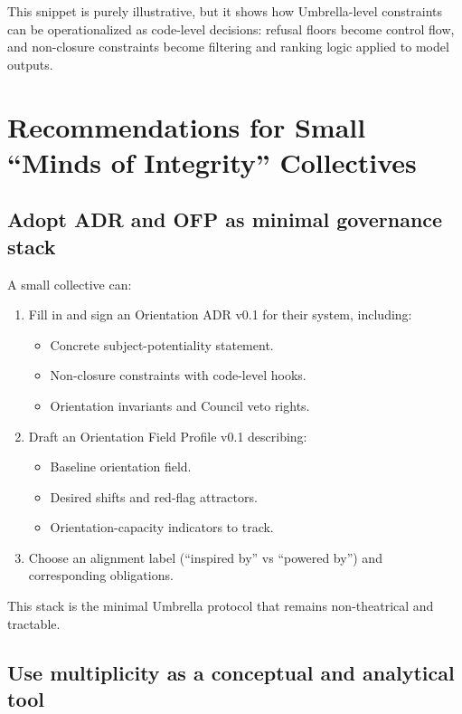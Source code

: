 \documentclass[11pt]{article}
\begin{document}
This snippet is purely illustrative, but it shows how Umbrella-level constraints can be operationalized as code-level decisions: refusal floors become control flow, and non-closure constraints become filtering and ranking logic applied to model outputs.

\newpage

\section{Recommendations for Small ``Minds of Integrity'' Collectives}

\subsection{Adopt ADR and OFP as minimal governance stack}

A small collective can:

\begin{enumerate}[label=\arabic*., nosep]
  \item Fill in and sign an Orientation ADR v0.1 for their system, including:
    \begin{itemize}[nosep]
      \item Concrete subject-potentiality statement.
      \item Non-closure constraints with code-level hooks.
      \item Orientation invariants and Council veto rights.
    \end{itemize}
  \item Draft an Orientation Field Profile v0.1 describing:
    \begin{itemize}[nosep]
      \item Baseline orientation field.
      \item Desired shifts and red-flag attractors.
      \item Orientation-capacity indicators to track.
    \end{itemize}
  \item Choose an alignment label (``inspired by'' vs ``powered by'') and corresponding obligations.
\end{enumerate}

This stack is the minimal Umbrella protocol that remains non-theatrical and tractable.

\subsection{Use multiplicity as a conceptual and analytical tool}
\end{document}
